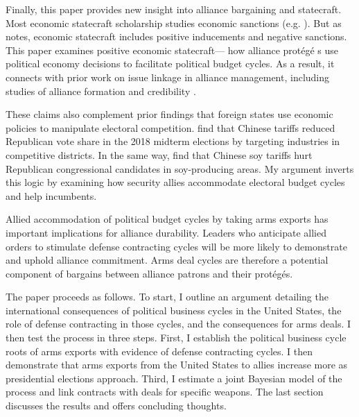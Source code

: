 \documentclass[12pt]{article}
\begin{document}


Finally, this paper provides new insight into alliance bargaining and statecraft. 
Most economic statecraft scholarship studies economic sanctions (e.g. \cite{Marinov2005, Allen2008, Escriba-FolchWright2010}).
But as \citet{Baldwin2020} notes, economic statecraft includes positive inducements and negative sanctions. 
This paper examines positive economic statecraft--- how alliance prot{\'e}g{\'e} s use political economy decisions to facilitate political budget cycles.
As a result, it connects with prior work on issue linkage in alliance management, including studies of alliance formation \citep{Poast2012} and credibility \citep{Davis2008, Poast2013}. 


These claims also complement prior findings that foreign states use economic policies to manipulate electoral competition. 
\citet{KimMargalit2021} find that Chinese tariffs reduced Republican vote share in the 2018 midterm elections by targeting industries in competitive districts.
In the same way, \citet{ChyzhUrbatsch2021} find that Chinese soy tariffs hurt Republican congressional candidates in soy-producing areas. 
My argument inverts this logic by examining how security allies accommodate electoral budget cycles and help incumbents. 


Allied accommodation of political budget cycles by taking arms exports has important implications for alliance durability. 
Leaders who anticipate allied orders to stimulate defense contracting cycles will be more likely to demonstrate and uphold alliance commitment. 
Arms deal cycles are therefore a potential component of bargains between alliance patrons and their prot{\'e}g{\'e}s. 


The paper proceeds as follows. 
To start, I outline an argument detailing the international consequences of political business cycles in the United States, the role of defense contracting in those cycles, and the consequences for arms deals. 
I then test the process in three steps. 
First, I establish the political business cycle roots of arms exports with evidence of defense contracting cycles. 
I then demonstrate that arms exports from the United States to allies increase more as presidential elections approach.
Third, I estimate a joint Bayesian model of the process and link contracts with deals for specific weapons.
The last section discusses the results and offers concluding thoughts.
\end{document}
